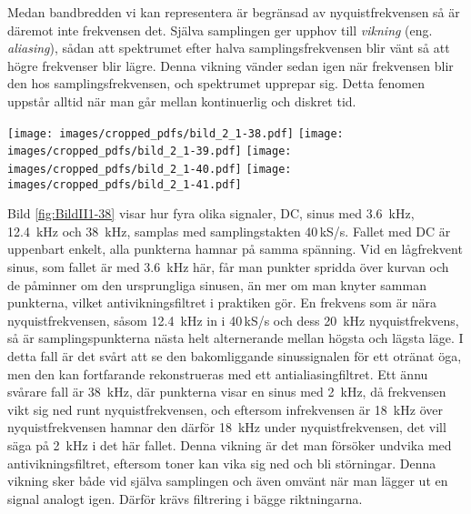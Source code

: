 Medan bandbredden vi kan representera är begränsad av nyquistfrekvensen så
är däremot inte frekvensen det.
Själva samplingen ger upphov till \emph{vikning} (eng. \emph{aliasing}),
sådan att spektrumet efter halva samplingsfrekvensen blir vänt så att högre
frekvenser blir lägre.
Denna vikning vänder sedan igen när frekvensen blir den hos
samplingsfrekvensen, och spektrumet upprepar sig.
Detta fenomen uppstår alltid när man går mellan kontinuerlig och diskret tid.

\begin{figure*}
\begin{center}
\texttt{[image: images/cropped\_pdfs/bild\_2\_1-38.pdf]}
\texttt{[image: images/cropped\_pdfs/bild\_2\_1-39.pdf]}
\texttt{[image: images/cropped\_pdfs/bild\_2\_1-40.pdf]}
\texttt{[image: images/cropped\_pdfs/bild\_2\_1-41.pdf]}
\caption{Sampling av DC; \SI{3,6}{\kilo\hertz}; \SI{12,4}{\kilo\hertz} och \SI{38}{\kilo\hertz} med \SI{40}{kS/s} samplingstakt}
\label{fig:BildII1-38}
\end{center}
\end{figure*}

Bild \ref{fig:BildII1-38} visar hur fyra olika signaler, DC, sinus med
\SI{3,6}{\kilo\hertz}, \SI{12,4}{\kilo\hertz} och \SI{38}{\kilo\hertz}, samplas
med samplingstakten 40\,kS/s.
Fallet med DC är uppenbart enkelt, alla punkterna hamnar på samma spänning.
Vid en lågfrekvent sinus, som fallet är med \SI{3,6}{\kilo\hertz} här, får man
punkter spridda över kurvan och de påminner om den ursprungliga sinusen, än mer
om man knyter samman punkterna, vilket antivikningsfiltret i praktiken gör.
En frekvens som är nära nyquistfrekvensen, såsom \SI{12,4}{\kilo\hertz} in i
40\,kS/s och dess \SI{20}{\kilo\hertz} nyquistfrekvens, så är samplingspunkterna
nästa helt alternerande mellan högsta och lägsta läge.
I detta fall är det svårt att se den bakomliggande sinussignalen för ett otränat
öga, men den kan fortfarande rekonstrueras med ett antialiasingfiltret.
Ett ännu svårare fall är \SI{38}{\kilo\hertz}, där punkterna visar en sinus med
\SI{2}{\kilo\hertz}, då frekvensen vikt sig ned runt nyquistfrekvensen, och
eftersom infrekvensen är \SI{18}{\kilo\hertz} över nyquistfrekvensen hamnar den
därför \SI{18}{\kilo\hertz} under nyquistfrekvensen, det vill säga på
\SI{2}{\kilo\hertz} i det här fallet.
Denna vikning är det man försöker undvika med antivikningsfiltret, eftersom
toner kan vika sig ned och bli störningar.
Denna vikning sker både vid själva samplingen och även omvänt när man lägger ut
en signal analogt igen. Därför krävs filtrering i bägge riktningarna.

